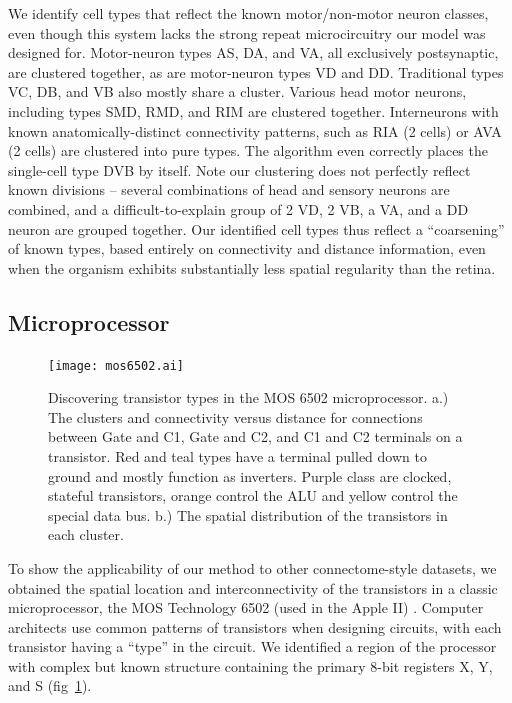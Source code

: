 \documentclass{article}
\begin{document}
We identify cell types that reflect the known motor/non-motor neuron
classes, even though this system lacks the strong repeat
microcircuitry our model was designed for.  Motor-neuron types AS, DA,
and VA, all exclusively postsynaptic, are clustered together, as are
motor-neuron types VD and DD. Traditional types VC, DB, and VB also
mostly share a cluster. Various head motor neurons, including types
SMD, RMD, and RIM are clustered together. Interneurons with known
anatomically-distinct connectivity patterns, such as RIA (2 cells) or
AVA (2 cells) are clustered into pure types. The algorithm even
correctly places the single-cell type DVB by itself. Note our
clustering does not perfectly reflect known divisions -- several
combinations of head and sensory neurons are combined, and a
difficult-to-explain group of 2 VD, 2 VB, a VA, and a DD neuron are
grouped together. Our identified cell types thus reflect a
``coarsening'' of known types, based entirely on connectivity and
distance information, even when the organism exhibits substantially
less spatial regularity than the retina. 


\subsection{Microprocessor}
\begin{figure}
  \centering 
  \centerline{\texttt{[image: mos6502.ai]}}
  \caption{Discovering transistor types in the MOS 6502
    microprocessor. a.) The clusters and connectivity versus distance
    for connections between Gate and C1, Gate and C2, and C1 and C2
    terminals on a transistor. Red and teal types have a terminal
    pulled down to ground and mostly function as inverters. Purple
    class are clocked, stateful transistors, orange control the ALU
    and yellow control the special data bus. b.) The spatial
    distribution of the transistors in each cluster. }
\label{fig:mos6502}
\end{figure}

To show the applicability of our method to other connectome-style
datasets, we obtained the spatial location and interconnectivity of
the transistors in a classic microprocessor, the MOS Technology 6502
(used in the Apple II) \autocite{James2010}. Computer architects use
common patterns of transistors when designing circuits, with each
transistor having a ``type'' in the circuit. We identified a region of
the processor with complex but known structure containing the primary
8-bit registers X, Y, and S (fig~\ref{fig:mos6502}).
\end{document}
